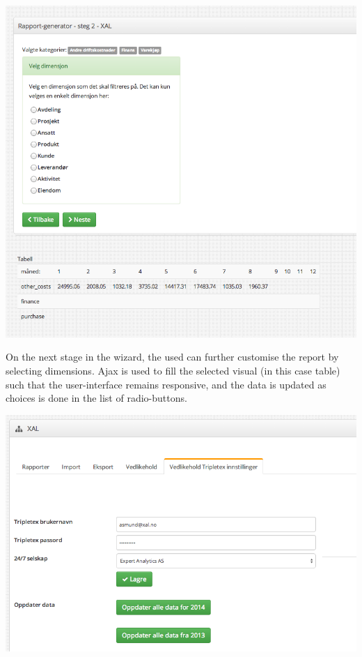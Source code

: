\documentclass[11pt]{article}
\begin{document}
\noindent
\includegraphics[width=\textwidth]{portfolio-graphics/sb-stage2.png}

\vspace{\baselineskip}
\noindent
On the next stage in the wizard, the used can further customise the report by selecting dimensions. Ajax is used to fill the selected visual (in this case table) such that the user-interface remains responsive, and the data is updated as choices is done in the list of radio-buttons.

\noindent
\includegraphics[width=\textwidth]{portfolio-graphics/api-maint.png}
\end{document}
